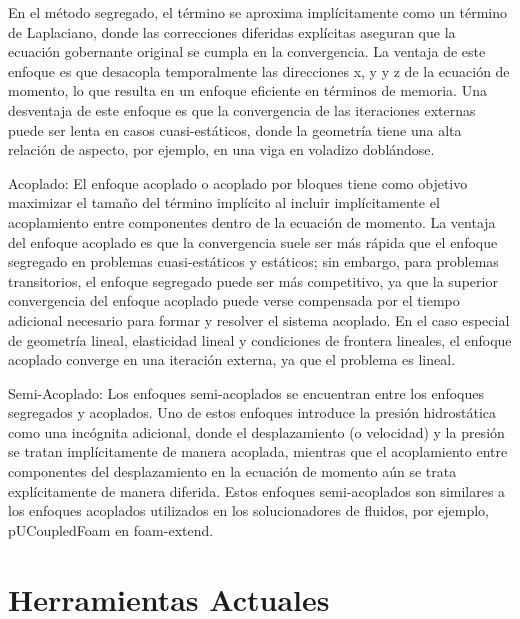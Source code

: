 \documentclass{article}
\begin{document}
En el método segregado, el término se aproxima implícitamente como un término de Laplaciano, donde las correcciones diferidas explícitas aseguran que la ecuación gobernante original se cumpla en la convergencia. La ventaja de este enfoque es que desacopla temporalmente las direcciones x, y y z de la ecuación de momento, lo que resulta en un enfoque eficiente en términos de memoria. Una desventaja de este enfoque es que la convergencia de las iteraciones externas puede ser lenta en casos cuasi-estáticos, donde la geometría tiene una alta relación de aspecto, por ejemplo, en una viga en voladizo doblándose.

Acoplado: El enfoque acoplado o acoplado por bloques tiene como objetivo maximizar el tamaño del término implícito al incluir implícitamente el acoplamiento entre componentes dentro de la ecuación de momento. La ventaja del enfoque acoplado es que la convergencia suele ser más rápida que el enfoque segregado en problemas cuasi-estáticos y estáticos; sin embargo, para problemas transitorios, el enfoque segregado puede ser más competitivo, ya que la superior convergencia del enfoque acoplado puede verse compensada por el tiempo adicional necesario para formar y resolver el sistema acoplado. En el caso especial de geometría lineal, elasticidad lineal y condiciones de frontera lineales, el enfoque acoplado converge en una iteración externa, ya que el problema es lineal.

Semi-Acoplado: Los enfoques semi-acoplados se encuentran entre los enfoques segregados y acoplados. Uno de estos enfoques introduce la presión hidrostática como una incógnita adicional, donde el desplazamiento (o velocidad) y la presión se tratan implícitamente de manera acoplada, mientras que el acoplamiento entre componentes del desplazamiento en la ecuación de momento aún se trata explícitamente de manera diferida. Estos enfoques semi-acoplados son similares a los enfoques acoplados utilizados en los solucionadores de fluidos, por ejemplo, pUCoupledFoam en foam-extend.


\section{Herramientas Actuales}
\end{document}
